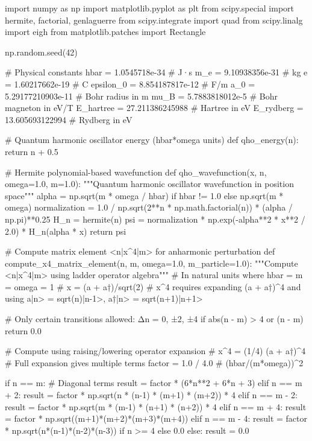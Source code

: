 \documentclass[a4paper, 11pt]{article}
\begin{document}
\begin{pycode}
import numpy as np
import matplotlib.pyplot as plt
from scipy.special import hermite, factorial, genlaguerre
from scipy.integrate import quad
from scipy.linalg import eigh
from matplotlib.patches import Rectangle

np.random.seed(42)

# Physical constants
hbar = 1.0545718e-34  # J·s
m_e = 9.10938356e-31  # kg
e = 1.60217662e-19    # C
epsilon_0 = 8.854187817e-12  # F/m
a_0 = 5.29177210903e-11  # Bohr radius in m
mu_B = 5.7883818012e-5  # Bohr magneton in eV/T
E_hartree = 27.211386245988  # Hartree in eV
E_rydberg = 13.605693122994  # Rydberg in eV

# Quantum harmonic oscillator energy (hbar*omega units)
def qho_energy(n):
    return n + 0.5

# Hermite polynomial-based wavefunction
def qho_wavefunction(x, n, omega=1.0, m=1.0):
    """Quantum harmonic oscillator wavefunction in position space"""
    alpha = np.sqrt(m * omega / hbar) if hbar != 1.0 else np.sqrt(m * omega)
    normalization = 1.0 / np.sqrt(2**n * np.math.factorial(n)) * (alpha / np.pi)**0.25
    H_n = hermite(n)
    psi = normalization * np.exp(-alpha**2 * x**2 / 2.0) * H_n(alpha * x)
    return psi

# Compute matrix element <n|x^4|m> for anharmonic perturbation
def compute_x4_matrix_element(n, m, omega=1.0, m_particle=1.0):
    """Compute <n|x^4|m> using ladder operator algebra"""
    # In natural units where hbar = m = omega = 1
    # x = (a + a†)/sqrt(2)
    # x^4 requires expanding (a + a†)^4 and using a|n> = sqrt(n)|n-1>, a†|n> = sqrt(n+1)|n+1>

    # Only certain transitions allowed: Δn = 0, ±2, ±4
    if abs(n - m) > 4 or (n - m) %
        return 0.0

    # Compute using raising/lowering operator expansion
    # x^4 = (1/4) (a + a†)^4
    # Full expansion gives multiple terms
    factor = 1.0 / 4.0  # (hbar/(m*omega))^2

    if n == m:
        # Diagonal terms
        result = factor * (6*n**2 + 6*n + 3)
    elif n == m + 2:
        result = factor * np.sqrt(n * (n-1) * (m+1) * (m+2)) * 4
    elif n == m - 2:
        result = factor * np.sqrt(m * (m-1) * (n+1) * (n+2)) * 4
    elif n == m + 4:
        result = factor * np.sqrt((m+1)*(m+2)*(m+3)*(m+4))
    elif n == m - 4:
        result = factor * np.sqrt(n*(n-1)*(n-2)*(n-3)) if n >= 4 else 0.0
    else:
        result = 0.0


\end{pycode}
\end{document}
